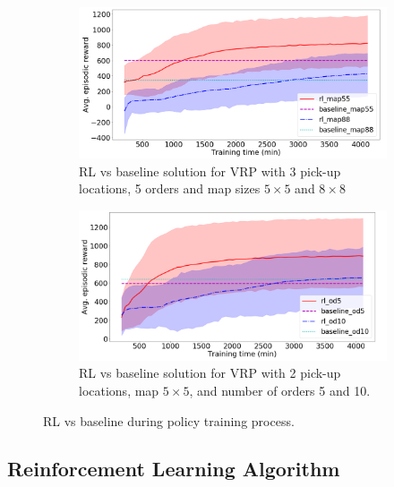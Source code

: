 \documentclass[letterpaper]{article} %
\begin{document}
\begin{figure}[h!]
	\centering
	\begin{subfigure}[b]{0.45\textwidth}
		\centering
		\includegraphics[width=1\linewidth]{vrp_images/vrp_mapsize_black.png}
		\caption{RL vs baseline solution for VRP with 3 pick-up locations, 5 orders and map sizes $5 \times 5$ and $8 \times 8$ }
		\label{fig:vrp_mapsize}
	\end{subfigure}
	\hspace{2em}
	\begin{subfigure}[b]{0.45\textwidth}
		\centering
		\includegraphics[width=1\linewidth]{vrp_images/vrp_ordernumber_black.png}
		\caption{RL vs baseline solution for VRP with 2 pick-up locations, map $5 \times 5$, and number of orders 5 and 10. }
		\label{fig:vrp_ordernumber}
	\end{subfigure}
	\label{fig:vrp}
	\caption{RL vs baseline during policy training process.}
\end{figure}

\subsection{Reinforcement Learning Algorithm}
\label{subsec:vrp_rl}
\end{document}

